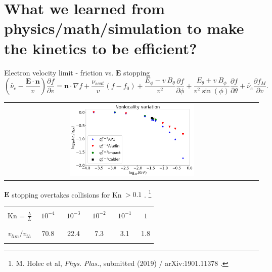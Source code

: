 \documentclass[8pt, compress]{beamer}
\newcommand{\pdv}[2]{\frac{\partial{#1}}{\partial{#2}}}
\newcommand{\vect}[1]{\boldsymbol{#1}}
\newcommand{\nue}{\nu_{e}}
\newcommand{\nuscat}{\nu_{scat}}
\newcommand{\vmag}{v}
\newcommand{\vn}{\vect{n}}
\newcommand{\E}{\vect{E}}
\newcommand{\fM}{f_M}
\newcommand{\fzero}{f_0}
\begin{document}
\section{What we learned from physics/math/simulation to make the kinetics to be efficient?}
\begin{frame}
\begin{center}
{\Large Electron velocity limit - friction vs. $\vect{E}$ stopping}
\begin{equation}
  \left( \tilde{\nue} - \frac{\E\cdot\vn}{\vmag} \right) 
  \frac{\partial f}{\partial \vmag}
  =
  \vn\cdot\nabla f 
  + \frac{\nuscat}{\vmag} \left(f - \fzero\right)
  + \frac{E_\phi 
  - \vmag~B_\theta}{\vmag^2}\pdv{f}{\phi}
  + \frac{E_\theta + \vmag~B_\phi}{\vmag^2\sin(\phi)}\pdv{f}{\theta}
  + \tilde{\nue} \frac{\partial \fM}{\partial v} .
  \nonumber
\end{equation}

\begin{tabular}{c}
\includegraphics[width=0.5\textwidth]{../figures/Kn_results.png}
\end{tabular}

$\vect{E}$ stopping overtakes collisions for Kn$~>0.1$ .
\let\thefootnote\relax\footnote{M. Holec et al, \textit{Phys. Plas.}, submitted (2019) / arXiv:1901.11378 .}

\begin{tabular}{c|ccccc}
    \hline\hline\\
    Kn = $\frac{\lambda}{L}$ & $\,\,10^{-4}\,\,$ & $\,\,10^{-3}\,\,$ & $\,\,10^{-2}\,\,$ & $\,\,10^{-1}\,\,$ & $\,\,1\,\,$ \\\\
    \hline\\
    $v_{lim} / v_{th}$ & 70.8 & 22.4 & 7.3 & 3.1 & 1.8\\\\
    \hline\hline
\end{tabular} 
\end{center}
\end{frame}
\end{document}
